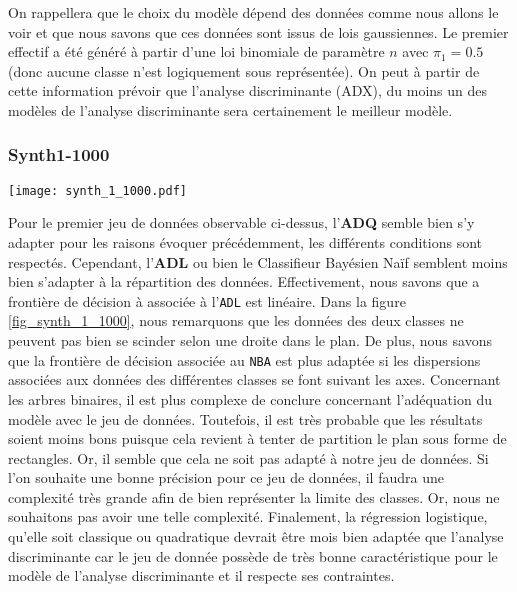 \documentclass{article}
\begin{document}
\begin{multicols}{2}
On rappellera que le choix du modèle dépend des données comme nous allons le voir et que nous savons que ces données sont issus de lois gaussiennes. Le premier effectif a été généré à partir d'une loi binomiale de paramètre $n$ avec $\pi_1=0.5$ (donc aucune classe n'est logiquement sous représentée). On peut à partir de cette information prévoir que l'analyse discriminante (ADX), du moins un des modèles de l'analyse discriminante sera certainement le meilleur modèle.

\subsubsection{Synth1-1000}
\label{subsubsec_Synth1_1000}

\begingroup
   \centering
   \texttt{[image: synth\_1\_1000.pdf]}
    \label{fig_synth_1_1000}
\endgroup

Pour le premier jeu de données observable ci-dessus, l'\textbf{ADQ} semble bien s'y adapter pour les raisons évoquer précédemment, les différents conditions sont respectés. Cependant, l'\textbf{ADL} ou bien le Classifieur Bayésien Naïf semblent moins bien s'adapter à la répartition des données. Effectivement, nous savons que a frontière de décision à associée à l'\texttt{ADL} est linéaire. Dans la figure \ref{fig_synth_1_1000}, nous remarquons que les données des deux classes ne peuvent pas bien se scinder selon une droite dans le plan. 
De plus, nous savons que la frontière de décision associée au \texttt{NBA} est plus adaptée si les dispersions associées aux données des différentes classes se font suivant les axes. Concernant les arbres binaires, il est plus complexe de conclure concernant l'adéquation du modèle avec le jeu de données. Toutefois, il est très probable que les résultats soient moins bons puisque cela revient à tenter de partition le plan sous forme de rectangles. Or, il semble que cela ne soit pas adapté à notre jeu de données. Si l'on souhaite une bonne précision pour ce jeu de données, il faudra une complexité très grande afin de bien représenter la limite des classes. Or, nous ne souhaitons pas avoir une telle complexité.
Finalement, la régression logistique, qu'elle soit classique ou quadratique devrait être mois bien adaptée que l'analyse discriminante car le jeu de donnée possède de très bonne caractéristique pour le modèle de l'analyse discriminante et il respecte ses contraintes.
\end{multicols}
\end{document}
